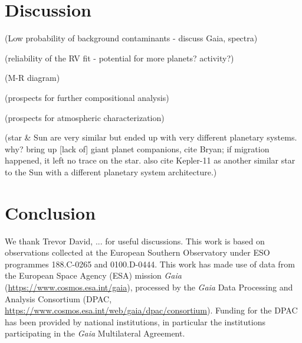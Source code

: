 \documentclass[modern]{aastex62}
\begin{document}
\section{Discussion}
\label{s:discussion}


(Low probability of background contaminants - discuss Gaia, spectra)

(reliability of the RV fit - potential for more planets? activity?)

(M-R diagram)

(prospects for further compositional analysis)

(prospects for atmospheric characterization)

(star \& Sun are very similar but ended up with very different planetary systems. why? bring up [lack of] giant planet companions, cite Bryan; if migration happened, it left no trace on the star. also cite Kepler-11 as another similar star to the Sun with a different planetary system architecture.)

\section{Conclusion}
\label{s:conclusion}


\acknowledgements
We thank Trevor David, ... for useful discussions.
This work is based on observations collected at the European Southern Observatory under ESO programmes 188.C-0265 and 0100.D-0444. 
This work has made use of data from the European Space Agency (ESA) mission
{\it Gaia} (\url{https://www.cosmos.esa.int/gaia}), processed by the {\it Gaia}
Data Processing and Analysis Consortium (DPAC,
\url{https://www.cosmos.esa.int/web/gaia/dpac/consortium}). Funding for the DPAC
has been provided by national institutions, in particular the institutions
participating in the {\it Gaia} Multilateral Agreement.





\end{document}

